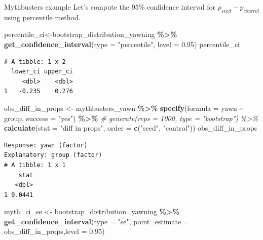 \documentclass[
  ignorenonframetext,
]{beamer}
\newenvironment{Shaded}{\begin{snugshade}}{\end{snugshade}}
\newcommand{\AttributeTok}[1]{\textcolor[rgb]{0.13,0.29,0.53}{#1}}
\newcommand{\CommentTok}[1]{\textcolor[rgb]{0.56,0.35,0.01}{\textit{#1}}}
\newcommand{\FloatTok}[1]{\textcolor[rgb]{0.00,0.00,0.81}{#1}}
\newcommand{\FunctionTok}[1]{\textcolor[rgb]{0.13,0.29,0.53}{\textbf{#1}}}
\newcommand{\NormalTok}[1]{#1}
\newcommand{\OtherTok}[1]{\textcolor[rgb]{0.56,0.35,0.01}{#1}}
\newcommand{\SpecialCharTok}[1]{\textcolor[rgb]{0.81,0.36,0.00}{\textbf{#1}}}
\newcommand{\StringTok}[1]{\textcolor[rgb]{0.31,0.60,0.02}{#1}}
\begin{document}
\begin{frame}[fragile]{Mythbusters example}
\protect\hypertarget{mythbusters-example-3}{}
Let's compute the \(95\%\) confidence interval for
\(p_{seed}-p_{control}\) using percentile method.

\tiny

\begin{Shaded}
\begin{Highlighting}[]
\NormalTok{percentile\_ci}\OtherTok{\textless{}{-}}\NormalTok{bootstrap\_distribution\_yawning }\SpecialCharTok{\%\textgreater{}\%} 
  \FunctionTok{get\_confidence\_interval}\NormalTok{(}\AttributeTok{type =} \StringTok{"percentile"}\NormalTok{, }\AttributeTok{level =} \FloatTok{0.95}\NormalTok{)}
\NormalTok{percentile\_ci}
\end{Highlighting}
\end{Shaded}

\begin{verbatim}
# A tibble: 1 x 2
  lower_ci upper_ci
     <dbl>    <dbl>
1   -0.235    0.276
\end{verbatim}

\begin{Shaded}
\begin{Highlighting}[]
\NormalTok{obs\_diff\_in\_props }\OtherTok{\textless{}{-}}\NormalTok{ mythbusters\_yawn }\SpecialCharTok{\%\textgreater{}\%} 
  \FunctionTok{specify}\NormalTok{(}\AttributeTok{formula =}\NormalTok{ yawn }\SpecialCharTok{\textasciitilde{}}\NormalTok{ group, }\AttributeTok{success =} \StringTok{"yes"}\NormalTok{) }\SpecialCharTok{\%\textgreater{}\%} 
  \CommentTok{\# generate(reps = 1000, type = "bootstrap") \%\textgreater{}\% }
  \FunctionTok{calculate}\NormalTok{(}\AttributeTok{stat =} \StringTok{"diff in props"}\NormalTok{, }\AttributeTok{order =} \FunctionTok{c}\NormalTok{(}\StringTok{"seed"}\NormalTok{, }\StringTok{"control"}\NormalTok{))}
\NormalTok{obs\_diff\_in\_props}
\end{Highlighting}
\end{Shaded}

\begin{verbatim}
Response: yawn (factor)
Explanatory: group (factor)
# A tibble: 1 x 1
    stat
   <dbl>
1 0.0441
\end{verbatim}

\begin{Shaded}
\begin{Highlighting}[]
\NormalTok{myth\_ci\_se }\OtherTok{\textless{}{-}}\NormalTok{ bootstrap\_distribution\_yawning }\SpecialCharTok{\%\textgreater{}\%} 
  \FunctionTok{get\_confidence\_interval}\NormalTok{(}\AttributeTok{type =} \StringTok{"se"}\NormalTok{, }\AttributeTok{point\_estimate =}\NormalTok{ obs\_diff\_in\_props,}\AttributeTok{level =} \FloatTok{0.95}\NormalTok{)}
\end{Highlighting}
\end{Shaded}

\normalsize
\end{frame}
\end{document}
